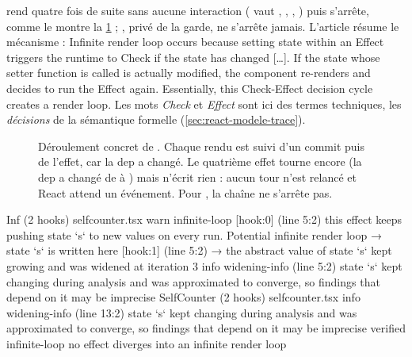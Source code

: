  rend quatre fois de suite sans aucune interaction
( vaut , , , ) puis s'arrête, comme le
montre la \cref{fig:react-modele-selfcounter} ; , privé de la garde,
ne s'arrête jamais. L'article résume le mécanisme : \og Infinite render loop
occurs because setting state within an Effect triggers the runtime to Check if
the state has changed [\dots]. If the state whose setter function is called is
actually modified, the component re-renders and decides to run the Effect
again. Essentially, this Check-Effect decision cycle creates a render
loop.\fg{} Les mots \emph{Check} et \emph{Effect} sont ici des termes
techniques, les \emph{décisions} de la sémantique formelle
(\cref{sec:react-modele-trace}).

\ifhastikz
\begin{figure}[htbp]\centering
{}
\caption{Déroulement concret de . Chaque rendu est suivi d'un
commit puis de l'effet, car la dep  a changé. Le quatrième effet tourne
encore (la dep a changé de  à ) mais n'écrit rien : aucun tour
n'est relancé et React attend un événement. Pour , la chaîne ne
s'arrête pas.}
\label{fig:react-modele-selfcounter}
\end{figure}
\fi

\begin{sortie}
  Inf  (2 hooks)  selfcounter.tsx
    warn   infinite-loop  [hook:0]  (line 5:2)  this effect keeps pushing state `s` to new values on every run. Potential infinite render loop
       → state `s` is written here [hook:1] (line 5:2)
       → the abstract value of state `s` kept growing and was widened at iteration 3
    info   widening-info  (line 5:2)  state `s` kept changing during analysis and was approximated to converge, so findings that depend on it may be imprecise
  SelfCounter  (2 hooks)  selfcounter.tsx
    info   widening-info  (line 13:2)  state `s` kept changing during analysis and was approximated to converge, so findings that depend on it may be imprecise
    verified  infinite-loop  no effect diverges into an infinite render loop
\end{sortie}

